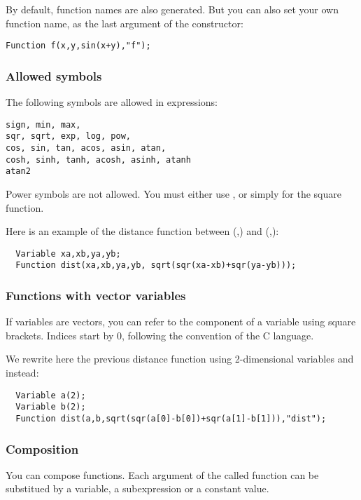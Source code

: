 By default, function names are also generated. But you can also set your own function name, as the last argument of the constructor:
\begin{lstlisting}
Function f(x,y,sin(x+y),"f");
\end{lstlisting}

\subsubsection{Allowed symbols}

The following symbols are allowed in expressions:
\begin{verbatim}
sign, min, max,
sqr, sqrt, exp, log, pow, 
cos, sin, tan, acos, asin, atan,
cosh, sinh, tanh, acosh, asinh, atanh
atan2
\end{verbatim}

Power symbols \cf{^} are not allowed. You must
either use , or simply  for the square function.

Here is an example of the distance function between (,) and
(,):

\begin{lstlisting}
  Variable xa,xb,ya,yb;
  Function dist(xa,xb,ya,yb, sqrt(sqr(xa-xb)+sqr(ya-yb)));
\end{lstlisting}

\subsubsection{Functions with vector variables}

If variables are vectors, you can refer to the component
of a variable using square brackets. Indices start by 0,
following the convention of the C language.

We rewrite here the previous distance function using 2-dimensional
variables  and  instead:
\begin{lstlisting}
  Variable a(2);
  Variable b(2);
  Function dist(a,b,sqrt(sqr(a[0]-b[0])+sqr(a[1]-b[1])),"dist");
\end{lstlisting}

\subsubsection{Composition}

You can compose functions. Each argument of the called function can be substitued
by a variable, a subexpression or a constant value.

